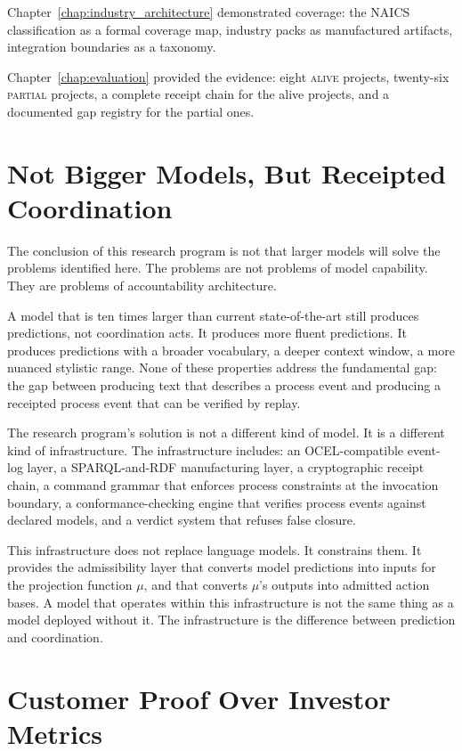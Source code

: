 Chapter~\ref{chap:industry_architecture} demonstrated coverage: the NAICS classification as a formal coverage map, industry packs as manufactured artifacts, integration boundaries as a taxonomy.

Chapter~\ref{chap:evaluation} provided the evidence: eight \textsc{alive} projects, twenty-six \textsc{partial} projects, a complete receipt chain for the alive projects, and a documented gap registry for the partial ones.

\section{Not Bigger Models, But Receipted Coordination}

The conclusion of this research program is not that larger models will solve the problems identified here. The problems are not problems of model capability. They are problems of accountability architecture.

A model that is ten times larger than current state-of-the-art still produces predictions, not coordination acts. It produces more fluent predictions. It produces predictions with a broader vocabulary, a deeper context window, a more nuanced stylistic range. None of these properties address the fundamental gap: the gap between producing text that describes a process event and producing a receipted process event that can be verified by replay.

The research program's solution is not a different kind of model. It is a different kind of infrastructure. The infrastructure includes: an OCEL-compatible event-log layer, a SPARQL-and-RDF manufacturing layer, a cryptographic receipt chain, a command grammar that enforces process constraints at the invocation boundary, a conformance-checking engine that verifies process events against declared models, and a verdict system that refuses false closure.

This infrastructure does not replace language models. It constrains them. It provides the admissibility layer that converts model predictions into inputs for the projection function $\mu$, and that converts $\mu$'s outputs into admitted action bases. A model that operates within this infrastructure is not the same thing as a model deployed without it. The infrastructure is the difference between prediction and coordination.

\section{Customer Proof Over Investor Metrics}

